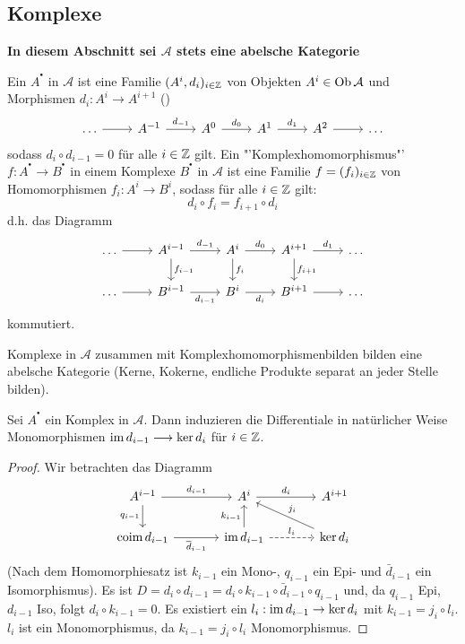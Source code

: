\subsection{Komplexe}
\begin{center}
	\textbf{In diesem Abschnitt sei $\mathcal{A}$ stets eine abelsche Kategorie}
\end{center}
\begin{df}\label{7.1}
	Ein  $A^{^\bullet}$ in $\mathcal{A}$ ist eine Familie $(A^i, d_i)_{i\in \mathbb{Z}}$ von Objekten $A^i \in \text{Ob}\,\mathcal{A}$ und Morphismen $d_i: A^i \to A^{i+1}$ ()
	$$\begin{tikzcd}
	\ldots \arrow{r} & A^{-1} \arrow{r}{d_{-1}}& A^0 \arrow{r}{d_0} & A^1 \arrow{r}{d_1} & A^2 \arrow{r} & \ldots
	\end{tikzcd}$$
	sodass $d_i \circ d_{i-1} =0$ für alle $i\in \mathbb{Z}$ gilt. Ein "'Komplexhomomorphismus"' $f:A^{^\bullet} \to B^{^\bullet}$ in einem Komplexe $B^{^\bullet}$ in $\mathcal{A}$ ist eine Familie $f=(f_i)_{i\in \mathbb{Z}}$ von Homomorphismen $f_i : A^i \to B^i$, sodass für alle $i\in \mathbb{Z}$ gilt:
	$$d_i \circ f_i = f_{i+1} \circ d_i$$
	d.h. das Diagramm 
	$$\begin{tikzcd}
	\ldots \arrow{r} & A^{i-1}\arrow{d}{f_{i-1}} \arrow{r}{d_{-1}}& A^i \arrow{d}{f_i}\arrow{r}{d_0} & A^{i+1} \arrow{d}{f_{i+1}} \arrow{r}{d_1} & \ldots\\
	\ldots \arrow{r} & B^{i-1} \arrow[swap]{r}{d_{i-1}} & B^i \arrow[swap]{r}{d_i} & B^{i+1} \arrow{r} & \ldots
	\end{tikzcd}$$
	kommutiert.
\end{df}
\begin{anm}
	Komplexe in $\mathcal{A}$ zusammen mit Komplexhomomorphismenbilden bilden eine abelsche Kategorie (Kerne, Kokerne, endliche Produkte separat an jeder Stelle bilden).
\end{anm}
\begin{bem}\label{7.2}
	Sei $A^{^\bullet}$ ein Komplex in $\mathcal{A}$. Dann induzieren die Differentiale in natürlicher Weise Monomorphismen $\operatorname{im} d_{i-1} \longrightarrow \ker d_i$ für $i\in \mathbb{Z}$.
\end{bem}
\begin{proof}
	Wir betrachten das Diagramm
	$$\begin{tikzcd}[column sep = large]
	A^{i-1} \arrow[swap]{d}{q_{i-1}} \arrow{r}{d_{i-1}} & A^i \arrow{r}{d_i} & A^{i+1} \\
	\text{coim} \, d_{i-1} \arrow[swap]{r}{\bar{d}_{i-1}} & \im d_{i-1} \arrow{u}{k_{i-1}}\arrow[dashed]{r}{l_i} & \ker d_i \arrow[swap]{ul}{j_i}
	\end{tikzcd}$$
	(Nach dem Homomorphiesatz ist $k_{i-1}$ ein Mono-, $q_{i-1}$ ein Epi- und $\bar{d}_{i-1}$ ein Isomorphismus). Es ist $D= d_i \circ d_{i-1} = d_i \circ k_{i-1} \circ \bar{d}_{i-1} \circ q_{i-1}$ und, da $q_{i-1}$ Epi, $d_{i-1}$ Iso, folgt $d_i \circ k_{i-1} =0$. Es existiert ein $l_i : \operatorname{im} d_{i-1} \to \ker d_i$ mit $k_{i-1} = j_i \circ l_i$. $l_i$ ist ein Monomorphismus, da $k_{i-1} = j_i \circ l_i$ Monomorphismus.
\end{proof}

